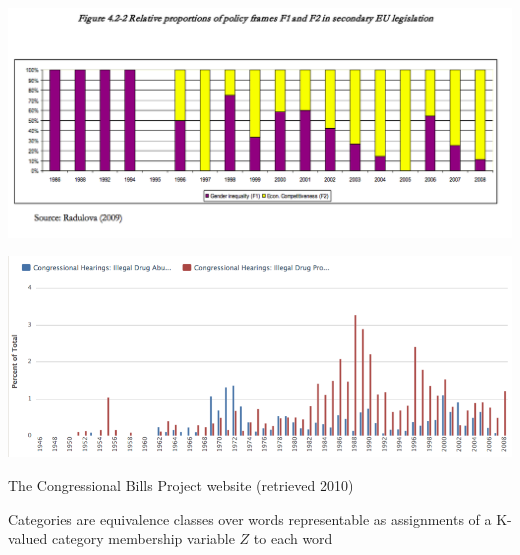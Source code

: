 \documentclass{mediumfoils}
\begin{document}

\centerline{\includegraphics[scale=.75]{pictures/radulova-frames2}}



\centerline{\includegraphics[scale=.75]{pictures/drugs}}

The Congressional Bills Project website (retrieved 2010)
%
%
%

%
%
%
%
%
%



Categories are
\ita
\itm equivalence classes over words
\itm representable as assignments of a K-valued category membership variable $Z$ to each word
\itz
\end{document}
